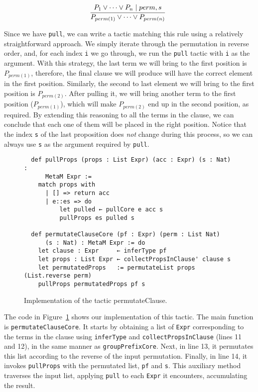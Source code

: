 \[
  \infer[]{P_{perm(1)} \vee \cdots \vee P_{perm(n)}}{P_{1} \vee \cdots \vee P_{n} \mid perm, s}
\]


Since we have \texttt{pull}, we can write a tactic matching
this rule using a relatively straightforward approach. We simply iterate through the permutation in
reverse order, and, for each index \texttt{i} we go through, we run the \texttt{pull} tactic
with \texttt{i} as the argument. With this strategy, the last term we will bring to the first position is
$P_{perm(1)}$, therefore, the final clause we will produce will have the correct element in the first position.
Similarly, the second to last element we will bring to the first
position is $P_{perm(2)}$. After pulling it, we will bring another term to the first position ($P_{perm(1)}$), which will make $P_{perm(2)}$
end up in the second position, as required. By extending this reasoning to all the terms in the clause,
we can conclude that each one of them will be placed in the right position. Notice that the index \texttt{s} of
the last proposition does \textit{not} change during this process, so we can always use \texttt{s} as the argument
required by \texttt{pull}.

\begin{figure}[t]
\begin{verbatim}
  def pullProps (props : List Expr) (acc : Expr) (s : Nat) :
      MetaM Expr :=
    match props with
      | [] => return acc
      | e::es => do
          let pulled ← pullCore e acc s
          pullProps es pulled s

  def permutateClauseCore (pf : Expr) (perm : List Nat)
      (s : Nat) : MetaM Expr := do
    let clause : Expr     ← inferType pf
    let props : List Expr ← collectPropsInClause' clause s
    let permutatedProps   := permutateList props (List.reverse perm)
    pullProps permutatedProps pf s
\end{verbatim}
\caption{Implementation of the tactic permutateClause.}\label{permClauseImp}
\end{figure}

The code in Figure~\ref{permClauseImp} shows our implementation of this tactic.
The main function is \texttt{permutateClauseCore}. It starts by obtaining a list of
\texttt{Expr} corresponding to the terms in the clause using \texttt{inferType}
and \texttt{collectPropsInClause} (lines 11 and 12), in the same manner as
\texttt{groupPrefixCore}. Next, in line 13, it permutates this list according
to the reverse of the input permutation. Finally, in line 14, it invokes
\texttt{pullProps} with the permutated list, \texttt{pf} and \texttt{s}.
This auxiliary method traverses the input list, applying \texttt{pull} to
each \texttt{Expr} it encounters, accumulating the result.

